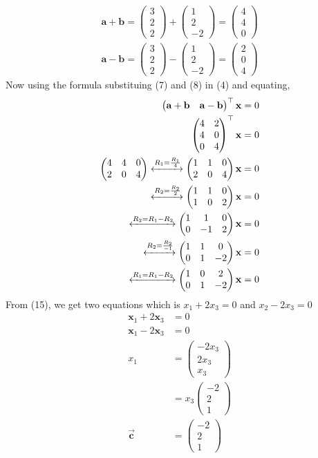 \documentclass[journal,10pt,twocolumn]{article}
\newcommand{\myvec}[1]{\ensuremath{\begin{pmatrix}#1\end{pmatrix}}}
\let\vec\mathbf
\let\vec\mathbf
\begin{document}
\begin{enumerate}
\begin{align}
\vec{a+b}=\myvec{3\\2\\2}+\myvec{1\\2\\-2}=\myvec{4\\4\\0}\label{7}\\
\vec{a-b}=\myvec{3\\2\\2}-\myvec{1\\2\\-2}=\myvec{2\\0\\4}\label{8}
\end{align}
Now using the formula substituing (7) and (8) in (4) and equating,
\begin{align}
\myvec{\vec{a}+\vec{b}& \vec{a}-\vec{b}}^\top\vec{x}&=0\\
\myvec{
4&2\\
4&0\\
0&4
}^\top \vec{x}&=0\\
\myvec{
4&4&0\\
2&0&4
}
\xleftrightarrow[]{R_1=\frac{R_1}{4}}
\myvec{
1&1&0\\
2&0&4
}\vec{x}&=0\\\xleftrightarrow[]{R_2=\frac{R_2}{2}}
\myvec{
1&1&0\\
1&0&2
}\vec{x}&=0\\
\xleftrightarrow[]{R_2={R_1}-{R_2}}
\myvec{
1&1&0\\
0&-1&2
}\vec{x}&=0\\
\xleftrightarrow[]{R_2=\frac{R_2}{-1}}
\myvec{
1&1&0\\
0&1&-2
}\vec{x}&=0\\
\xleftrightarrow[]{R_1={R_1}-{R_2}}
\myvec{
1&0&2\\
0&1&-2
}\vec{x}&=0
\end{align}
From (15), we get two equations which is $x_1+2x_3=0$ and $x_2-2x_3=0$
\begin{align}
\vec{x}_1+2\vec{x}_3&=0\\
\vec{x}_1-2\vec{x}_3&=0\\
x_1&=\myvec{-2x_3\\2x_3\\x_3}\\
&=x_3\myvec{-2\\2\\1}\\
\overrightarrow{\vec{c}}&=\myvec{-2\\2\\1}

\end{align}
\end{enumerate}
\end{document}
